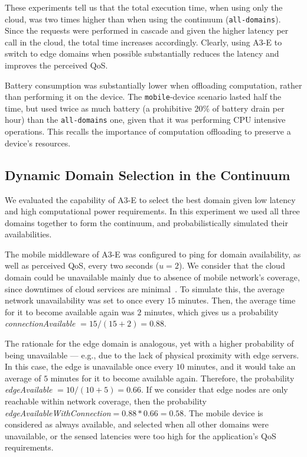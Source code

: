 These experiments tell us that the total execution time, when using only the cloud, was two times higher than when using the continuum (\texttt{all-domains}). Since the requests were performed in cascade and given the higher latency per call in the cloud, the total time increases accordingly. Clearly, using A3-E to switch to edge domains when possible substantially reduces the latency and improves the perceived QoS.

Battery consumption was substantially lower when offloading computation, rather than performing it on the device. The \texttt{mobile}-device scenario lasted half the time, but used twice as much battery (a prohibitive $20$\% of battery drain per hour) than the \texttt{all-domains} one, given that it was performing CPU intensive operations. This recalls the importance of computation offloading to preserve a device's resources.

\subsection{Dynamic Domain Selection in the Continuum}
\label{sub:domain-selection}

We evaluated the capability of A3-E to select the best domain given low latency and high computational power requirements. In this experiment we used all three domains together to form the continuum, and probabilistically simulated their availabilities. 

The mobile middleware of A3-E was configured to ping for domain availability, as well as perceived QoS, every two seconds ($u = 2$). We consider that the cloud domain could be unavailable mainly due to absence of mobile network's coverage, since downtimes of cloud services are minimal~\cite{garcia2017bandwidth}. To simulate this, the average network unavailability was set to once every $15$ minutes. Then, the average time for it to become available again was $2$ minutes, which gives us a probability \textit{connectionAvailable} $=15/(15+2)=0.88$.


The rationale for the edge domain is analogous, yet with a higher probability of  being unavailable --- e.g., due to the lack of physical proximity with edge servers. In this case, the edge is unavailable once every $10$ minutes, and it would take an average of $5$ minutes for it to become available again. Therefore, the probability \textit{edgeAvailable} $=10/(10+5)=0.66$. If we consider that edge nodes are only reachable within network coverage, then the probability \textit{edgeAvailableWithConnection}$=0.88*0.66=0.58$. The mobile device is considered as always available, and selected when all other domains were unavailable, or the sensed latencies were too high for the application's QoS requirements. 

